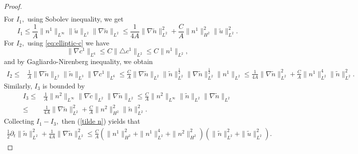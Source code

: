 \documentclass[12pt, reqno]{amsart}
\numberwithin{equation}{section}
\begin{document}
\begin{proof}
\begin{equation}
\begin{aligned}
		\end{aligned}
	\end{equation}
	For $ I_{1}, $ using Sobolev inequality, we get
	\begin{equation*}
		I_{1}\leq\frac{1}{A}\|n^{1}\|_{L^{\infty}}\|\tilde{u}\|_{L^{2}}\|\nabla\tilde{n}\|_{L^{2}}\leq\frac{1}{4A}\|\nabla\tilde{n}\|_{L^{2}}^{2}+\frac{C}{A}\|n^{1}\|_{H^{2}}^{2}\|\tilde{u}\|_{L^{2}}^{2}.
	\end{equation*} 
	  For $ I_{2}, $ using \eqref{eq:elliptic-c} we have
	\begin{equation}\label{c1 n1}
		\|\nabla c^{1}\|_{L^{6}}\leq C\|\triangle c^{1}\|_{L^{2}}\leq C\|n^{1}\|_{L^{2}},
	\end{equation}
	and by Gagliardo-Nirenberg inequality, we obtain
	\begin{equation*}
		\begin{aligned}
		I_{2}\leq&\frac{1}{A}\|\nabla\tilde{n}\|_{L^{2}}\|\tilde{n}\|_{L^{3}}\|\nabla c^{1}\|_{L^{6}}\leq \frac{C}{A}\|\nabla\tilde{n}\|_{L^{2}}\|\tilde{n}\|_{L^{2}}^{\frac12}\|\nabla\tilde{n}\|_{L^{2}}^{\frac12}\|n^{1}\|_{L^{2}}\leq\frac{1}{4A}\|\nabla\tilde{n}\|_{L^{2}}^{2}
+\frac{C}{A}\|n^{1}\|_{L^{2}}^{4}\|\tilde{n}\|_{L^{2}}^{2}.
		\end{aligned}
	\end{equation*}
	Similarly,  $ I_{3} $ is bounded by
	\begin{equation*}
		\begin{aligned}
		I_{3}\leq&\frac{1}{A}\|n^{2}\|_{L^{\infty}}\|\nabla\tilde{c}\|_{L^{2}}\|\nabla\tilde{n}\|_{L^{2}}\leq\frac{C}{A}\|n^{2}\|_{L^{\infty}}\|\tilde{n}\|_{L^{2}}
\|\nabla\tilde{n}\|_{L^{2}}\\\leq&\frac{1}{4A}\|\nabla\tilde{n}\|_{L^{2}}^{2}+\frac{C}{A}\|n^{2}\|_{H^{2}}^{2}\|\tilde{n}\|_{L^{2}}^{2}.
		\end{aligned}
	\end{equation*}
	Collecting $ I_{1}-I_{3}, $ then (\ref{tilde n}) yields that
	\begin{equation}\label{end n}
		\begin{aligned} \frac12\partial_{t}\|\tilde{n}\|_{L^{2}}^{2}+\frac{1}{4A}\|\nabla\tilde{n}\|_{L^{2}}^{2}\leq\frac{C}{A}\left(\|n^{1}\|_{H^{2}}^{2}+\|n^{1}\|_{L^{2}}^{4}+\|n^{2}\|_{H^{2}}^{2} \right)\left(\|\tilde{n}\|_{L^{2}}^{2}+\|\tilde{u}\|_{L^{2}}^{2} \right).
		\end{aligned}
	\end{equation}
	

\end{proof}
\end{document}
